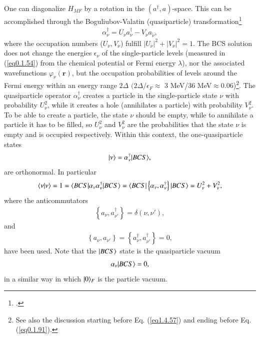 One can diagonalize $H_{MF}$ by a rotation in the $(a^\dagger,a)$-space. This can be accomplished through the Boguliubov-Valatin (quasiparticle) transformation\footnote{\cite{Bogoljubov:58,Bogoljubov:58b,Valatin:58}.}
\begin{align}\label{eq0.1.56}
\alpha^\dagger_\nu=U_\nu a^\dagger_\nu-V_\nu a_{\tilde\nu},
\end{align}
where the occupation numbers ($U_\nu,V_\nu$) fulfill $|U_\nu|^2+|V_\nu|^2=1$.
The BCS solution does not change the energies $\epsilon_\nu$ of the single-particle levels (measured in (\ref{eq0.1.54}) from the chemical potential or Fermi energy $\lambda$), nor the associated wavefunctions $\varphi_{\nu}(\mathbf r)$, but the occupation probabilities of levels around the Fermi energy within an energy range $2\Delta$ $(2\Delta/\epsilon_F\approx$ 3 MeV/36 MeV$\approx0.06$)\footnote{See also the discussion starting  before Eq. (\ref{eq1.4.57}) and ending  before Eq. (\ref{eq0.1.91}).}. The quasiparticle operator $\alpha^\dagger_\nu$ creates a particle in the single-particle state $\nu$ with probability $U^2_\nu$, while it creates a hole (annihilates a particle) with probability $V^2_\nu$. To be able to create a particle, the state $\nu$ should be empty, while to annihilate a particle it has to be filled, so $U^2_\nu$ and $V^2_\nu$ are the probabilities  that the state $\nu$ is empty and is occupied respectively. Within this context, the one-quasiparticle states   
\begin{align}\label{eq0.1.57}
|{\nu} \rangle=\alpha^\dagger_\nu|{BCS} \rangle,
\end{align}
are orthonormal. In particular
\begin{align}\label{eq0.1.58}
\langle {\nu|\nu} \rangle=1=\langle {BCS|\alpha_{\nu}\alpha^\dagger_\nu|BCS} \rangle=\langle {BCS|\left\{\alpha_{\nu},\alpha^\dagger_\nu\right\}|BCS} \rangle=U^2_\nu+V^2_\nu,
\end{align}
where the anticommutators
\begin{align}\label{eq0.1.59}
\left\{a_{\nu},a^\dagger_{\nu'}\right\}=\delta(\nu,\nu'),
\end{align}
and
\begin{align}\label{eq0.1.60}
\left\{a_{\nu},a_{\nu'}\right\}=\left\{a^\dagger_{\nu},a^\dagger_{\nu'}\right\}=0,
\end{align}
have been used. Note that the $|{BCS} \rangle$ state  is the quasiparticle vacuum
\begin{align}\label{eq0.1.61}
\alpha_\nu|{BCS} \rangle=0,
\end{align}
in a similar way in which $|{0} \rangle_F$ is the particle vacuum. 


